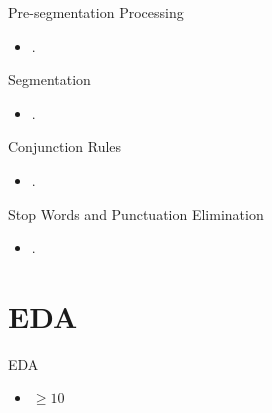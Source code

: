 \documentclass[12pt, trans]{beamer}
\newcommand{\1}[1]{{\mathbf 1}\left\{#1\right\}}        %
\begin{document}
\begin{frame}{Pre-segmentation Processing}

\begin{itemize}[<+->]
\item .
\end{itemize}

\end{frame}


\begin{frame}{Segmentation}

\begin{itemize}[<+->]
\item  .
\end{itemize}

\end{frame}

\begin{frame}{Conjunction Rules}

\begin{itemize}[<+->]
\item  .
\end{itemize}

\end{frame}

\begin{frame}{Stop Words and Punctuation Elimination}

\begin{itemize}[<+->]
\item .
\end{itemize}

\end{frame}



\section{EDA}

\begin{frame}{EDA}

\begin{itemize}[<+->]
\item $\geq 10$
\end{itemize}

\end{frame}
\end{document}
